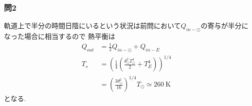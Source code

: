 \documentclass[uplatex,a4j,11pt,dvipdfmx]{jsarticle}
\begin{document}
\subsubsection*{問2}
軌道上で半分の時間日陰にいるという状況は前問において$Q_{in-\odot}$の寄与が半分になった場合に相当するので
熱平衡は
\begin{align}
  Q_{out}&=\frac{1}{2}Q_{in-\odot}+Q_{in-E}\\
  T_s&=\left(\frac{1}{4}(\frac{\theta_\odot^2 T_\odot^4}{2}+T_E^4)\right)^{1/4}\\
  &=\left(\frac{3\theta_\odot^2}{16}\right)^{1/4}T_\odot\simeq 260\ \si{\kelvin}
\end{align}
となる.
\end{document}
